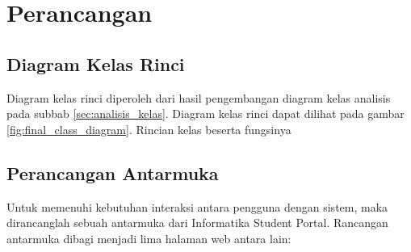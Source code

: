 \chapter{Perancangan}
\label{chap:perancangan}

\section{Diagram Kelas Rinci} 
\label{sec:diagram_kelas_rinci}
Diagram kelas rinci diperoleh dari hasil pengembangan diagram kelas analisis pada subbab \ref{sec:analisis_kelas}. Diagram kelas rinci dapat dilihat pada gambar \ref{fig:final_class_diagram}. Rincian kelas beserta fungsinya

\section{Perancangan Antarmuka}
\label{sec:perancangan_antarmuka}

Untuk memenuhi kebutuhan interaksi antara pengguna dengan sistem, maka dirancanglah sebuah antarmuka dari Informatika Student Portal. Rancangan antarmuka dibagi menjadi lima halaman web antara lain:

